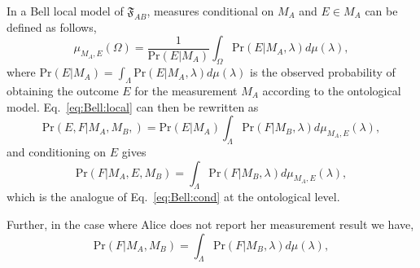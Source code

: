 \documentclass[DIV=calc,fontsize=12pt]{scrartcl} %
\theoremstyle{definition}
\theoremstyle{plain}
\begin{document}
In a Bell local model of $\mathfrak{F}_{AB}$, measures conditional on
$M_A$ and $E \in M_A$ can be defined as follows,
\begin{equation}
\label{eq:Bell:condprobs}
\mu_{M_A,E}(\Omega) = \frac{1}{\text{Pr}(E|M_A)}\int_{\Omega}
\text{Pr}(E|M_A,\lambda) d\mu(\lambda),
\end{equation}
where $\text{Pr}(E|M_A) = \int_{\Lambda}
\text{Pr}(E|M_A,\lambda)d\mu(\lambda)$ is the observed probability of
obtaining the outcome $E$ for the measurement $M_A$ according to the
ontological model.  Eq.~\eqref{eq:Bell:local} can then be
rewritten as
\begin{equation}
\text{Pr}(E,F|M_A,M_B,) = \text{Pr}(E|M_A)\int_{\Lambda} \text{Pr}(F|M_B,\lambda)
d\mu_{M_A,E}(\lambda),
\end{equation}
and conditioning on $E$ gives
\begin{equation}
\text{Pr}(F|M_A,E,M_B) = \int_{\Lambda} \text{Pr}(F|M_B,\lambda)
d\mu_{M_A,E}(\lambda),
\end{equation}
which is the analogue of Eq.~\eqref{eq:Bell:cond} at the ontological
level.

Further, in the case where Alice does not report her measurement
result we have,
\begin{equation}
\text{Pr}(F|M_A,M_B) = \int_{\Lambda} \text{Pr}(F|M_B,\lambda)
d\mu(\lambda),
\end{equation}
\end{document}

